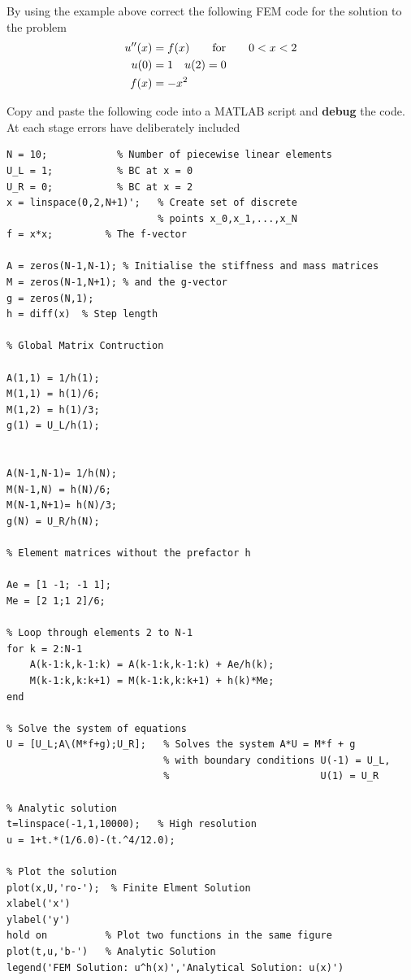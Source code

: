 \documentclass[12pt]{report}
\begin{document}
\begin{tcolorbox}[title=Task]
By using the example above correct the following FEM code for the solution to the problem 
\begin{equation}\label{BVPc}
\begin{split}
u''(x)&=f(x)\qquad\textnormal{for}\qquad{0}<x<2\\
u(0)&=1\quad{u}(2)=0\\
f(x)&=-x^2
\end{split}
\end{equation}

Copy and paste the following code into a MATLAB script and \textbf{debug} the code. At each stage errors have deliberately included
\end{tcolorbox}
\newpage

\begin{lstlisting}
N = 10;            % Number of piecewise linear elements  
U_L = 1;           % BC at x = 0
U_R = 0;           % BC at x = 2
x = linspace(0,2,N+1)';   % Create set of discrete 
                          % points x_0,x_1,...,x_N
f = x*x;         % The f-vector

A = zeros(N-1,N-1); % Initialise the stiffness and mass matrices
M = zeros(N-1,N+1); % and the g-vector
g = zeros(N,1);
h = diff(x)  % Step length

% Global Matrix Contruction 

A(1,1) = 1/h(1); 
M(1,1) = h(1)/6;
M(1,2) = h(1)/3;
g(1) = U_L/h(1);


A(N-1,N-1)= 1/h(N);
M(N-1,N) = h(N)/6;
M(N-1,N+1)= h(N)/3;
g(N) = U_R/h(N);

% Element matrices without the prefactor h

Ae = [1 -1; -1 1];
Me = [2 1;1 2]/6;

% Loop through elements 2 to N-1
for k = 2:N-1
    A(k-1:k,k-1:k) = A(k-1:k,k-1:k) + Ae/h(k);
    M(k-1:k,k:k+1) = M(k-1:k,k:k+1) + h(k)*Me;
end

% Solve the system of equations
U = [U_L;A\(M*f+g);U_R];   % Solves the system A*U = M*f + g 
                           % with boundary conditions U(-1) = U_L, 
                           %                          U(1) = U_R

% Analytic solution 
t=linspace(-1,1,10000);   % High resolution 
u = 1+t.*(1/6.0)-(t.^4/12.0);

% Plot the solution 
plot(x,U,'ro-');  % Finite Elment Solution 
xlabel('x')
ylabel('y')
hold on          % Plot two functions in the same figure
plot(t,u,'b-')   % Analytic Solution
legend('FEM Solution: u^h(x)','Analytical Solution: u(x)')
    
\end{lstlisting}
\end{document}
